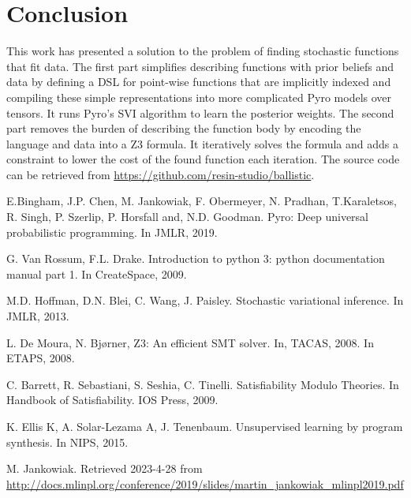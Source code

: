 \documentclass[runningheads]{llncs}
\begin{document}
\section{Conclusion}
This work has presented a solution to the problem of finding stochastic functions that fit data.
The first part simplifies describing functions with prior beliefs and data by defining a DSL for
point-wise functions that are implicitly indexed and compiling these simple representations
into more complicated Pyro models over tensors. It runs Pyro's SVI algorithm to learn the posterior weights. 
The second part removes the burden of describing the function body by encoding the language and data into a Z3 formula. 
It iteratively solves the formula and adds a constraint to lower the cost of the found function each iteration.  
The source code can be retrieved from \url{https://github.com/resin-studio/ballistic}.

\newpage

\begin{thebibliography}{9}

E.Bingham, J.P. Chen, M. Jankowiak, F. Obermeyer, N. Pradhan, T.Karaletsos, R. Singh, P. Szerlip, P. Horsfall and, N.D. Goodman. Pyro: Deep universal probabilistic programming. In JMLR, 2019. 

G. Van Rossum, F.L. Drake. Introduction to python 3: python documentation manual part 1. In CreateSpace, 2009.

M.D. Hoffman, D.N. Blei, C. Wang, J. Paisley. Stochastic variational inference. In JMLR, 2013.

L. De Moura, N. Bjørner, Z3: An efficient SMT solver. In, TACAS, 2008. In ETAPS, 2008.

C. Barrett, R. Sebastiani, S. Seshia, C. Tinelli. Satisfiability Modulo Theories. In
Handbook of Satisfiability. IOS Press, 2009.

K. Ellis K, A. Solar-Lezama A, J. Tenenbaum. Unsupervised learning by program synthesis. In NIPS, 2015.

M. Jankowiak. Retrieved 2023-4-28 from \url{http://docs.mlinpl.org/conference/2019/slides/martin_jankowiak_mlinpl2019.pdf} 


\end{thebibliography}
\end{document}
